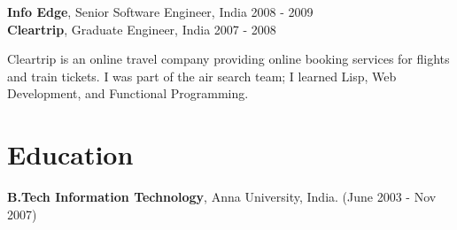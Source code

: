 \documentclass[margin, line, 10pt]{res}
\begin{document}
\begin{resume}
{\Large {\bf Info Edge}}, Senior Software Engineer, India \hfill 2008 - 2009 \\

{\Large {\bf Cleartrip}}, Graduate Engineer, India \hfill 2007 - 2008\\
\vspace{-.3cm}
\begin{adjustwidth}{.5em}{0pt}
  Cleartrip is an online travel company providing online booking services for flights and train tickets. I was part of the air search team; I learned Lisp, Web Development, and Functional Programming.
\end{adjustwidth}
\vspace{.05cm}

\section{Education}
{\bf B.Tech Information Technology}, Anna University, India. \hfill (June 2003 - Nov 2007)


\end{resume}
\end{document}
